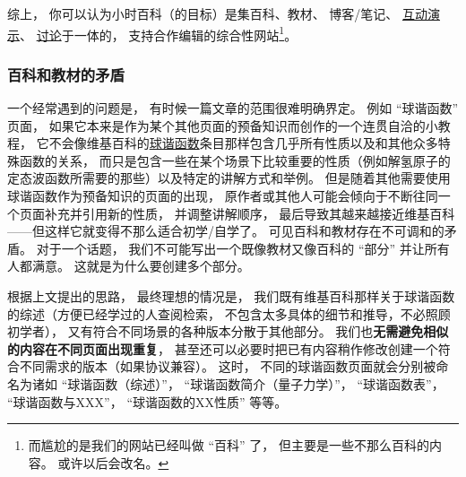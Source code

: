 综上， 你可以认为小时百科（的目标）是集百科、教材、 博客/笔记、 \href{http://wuli.wiki/apps}{互动演示}、 \href{http://wuli.wiki/forum}{讨论}于一体的， 支持合作编辑的综合性网站\footnote{而尴尬的是我们的网站已经叫做 “百科” 了， 但主要是一些不那么百科的内容。 或许以后会改名。}。





\subsubsection{百科和教材的矛盾}
一个经常遇到的问题是， 有时候一篇文章的范围很难明确界定。 例如 “球谐函数” 页面， 如果它本来是作为某个其他页面的预备知识而创作的一个连贯自洽的小教程， 它不会像维基百科的\href{https://en.wikipedia.org/wiki/Spherical_harmonics}{球谐函数}条目那样包含几乎所有性质以及和其他众多特殊函数的关系， 而只是包含一些在某个场景下比较重要的性质（例如解氢原子的定态波函数所需要的那些）以及特定的讲解方式和举例。 但是随着其他需要使用球谐函数作为预备知识的页面的出现， 原作者或其他人可能会倾向于不断往同一个页面补充并引用新的性质， 并调整讲解顺序， 最后导致其越来越接近维基百科——但这样它就变得不那么适合初学/自学了。 可见百科和教材存在不可调和的矛盾。 对于一个话题， 我们不可能写出一个既像教材又像百科的 “部分” 并让所有人都满意。 这就是为什么要创建多个部分。

根据上文提出的思路， 最终理想的情况是， 我们既有维基百科那样关于球谐函数的综述（方便已经学过的人查阅检索， 不包含太多具体的细节和推导，不必照顾初学者）， 又有符合不同场景的各种版本分散于其他部分。 我们也\textbf{无需避免相似的内容在不同页面出现重复}， 甚至还可以必要时把已有内容稍作修改创建一个符合不同需求的版本（如果协议兼容）。 这时， 不同的球谐函数页面就会分别被命名为诸如 “球谐函数（综述）”， “球谐函数简介（量子力学）”， “球谐函数表”， “球谐函数与XXX”， “球谐函数的XX性质” 等等。
